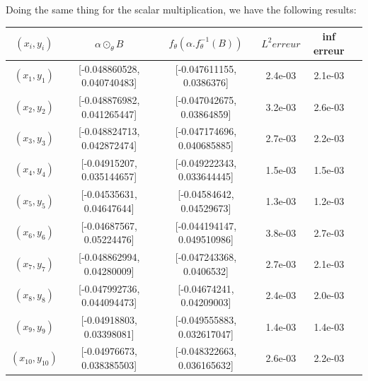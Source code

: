 \documentclass{report}
\begin{document}
            Doing the same thing for the scalar multiplication, we have the following results:\\

            \begin{tabular}{|c|c|c|c|c|c|}
                \hline
                $(x_i, y_i)$  & $ \alpha \odot_{\theta} B$ & $f_{\theta}(\alpha . f_{\theta}^{-1}(B))$ & $L^2 erreur$ & inf erreur \\
                \hline
                $(x_1, y_1)$ & [-0.048860528, 0.040740483] & [-0.047611155, 0.0386376] & 2.4e-03 & 2.1e-03 \\
                $(x_2, y_2)$ &  [-0.048876982, 0.041265447] & [-0.047042675, 0.03864859] & 3.2e-03 & 2.6e-03 \\
                $(x_3, y_3)$ & [-0.048824713, 0.042872474] & [-0.047174696, 0.040685885] & 2.7e-03 & 2.2e-03 \\
                $(x_4, y_4)$ &  [-0.04915207, 0.035144657] & [-0.049222343, 0.033644445] & 1.5e-03 & 1.5e-03 \\
                $(x_5, y_5)$ & [-0.04535631, 0.04647644] & [-0.04584642, 0.04529673] & 1.3e-03 & 1.2e-03 \\
                $(x_6, y_6)$ & [-0.04687567, 0.05224476] & [-0.044194147, 0.049510986] & 3.8e-03 & 2.7e-03 \\
                $(x_7, y_7)$ &  [-0.048862994, 0.04280009] & [-0.047243368, 0.0406532] & 2.7e-03 & 2.1e-03 \\
                $(x_8, y_8)$ & [-0.047992736, 0.044094473] & [-0.04674241, 0.04209003] & 2.4e-03 & 2.0e-03 \\
                $(x_9, y_9)$ &  [-0.04918803, 0.03398081] & [-0.049555883, 0.032617047] & 1.4e-03 & 1.4e-03 \\
                $(x_{10}, y_{10})$ & [-0.04976673, 0.038385503] & [-0.048322663, 0.036165632] & 2.6e-03 & 2.2e-03 \\
                \hline
            \end{tabular}
            \\
\end{document}
